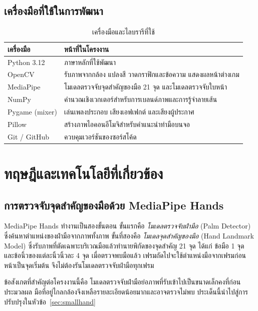 \documentclass[12pt,a4paper]{report}
\begin{document}
\section{เครื่องมือที่ใช้ในการพัฒนา}
\begin{table}[H]
  \centering
  \caption{เครื่องมือและไลบรารีที่ใช้}
  \label{tab:tools}
  \begin{tabularx}{\textwidth}{l Y}
    \toprule
    \textbf{เครื่องมือ} & \textbf{หน้าที่ในโครงงาน} \\
    \midrule
    Python 3.12 & ภาษาหลักที่ใช้พัฒนา \\
    OpenCV & รับภาพจากกล้อง แปลงสี วาดกราฟิกและข้อความ แสดงผลหน้าต่างเกม \\
    MediaPipe & โมเดลตรวจจับจุดสำคัญของมือ 21 จุด และโมเดลตรวจจับใบหน้า \\
    NumPy & คำนวณเชิงเวกเตอร์สำหรับการเบลนด์ภาพและการรู้จำลายเส้น \\
    Pygame (mixer) & เล่นเพลงประกอบ เสียงเอฟเฟกต์ และเสียงผู้ประกาศ \\
    Pillow & สร้างภาพไอคอนอีโมจิสำหรับคำแนะนำท่ามือบนจอ \\
    Git / GitHub & ควบคุมเวอร์ชันของซอร์สโค้ด \\
    \bottomrule
  \end{tabularx}
\end{table}

\chapter{ทฤษฎีและเทคโนโลยีที่เกี่ยวข้อง}

\section{การตรวจจับจุดสำคัญของมือด้วย MediaPipe Hands}
MediaPipe Hands \cite{zhang2020hands} ทำงานเป็นสองขั้นตอน ขั้นแรกคือ \textit{โมเดลตรวจจับฝ่ามือ} (Palm Detector)
ซึ่งค้นหาตำแหน่งของฝ่ามือจากภาพทั้งภาพ ขั้นที่สองคือ \textit{โมเดลจุดสำคัญของมือ} (Hand Landmark Model)
ซึ่งรับภาพที่ตัดเฉพาะบริเวณมือแล้วทำนายพิกัดของจุดสำคัญ 21 จุด ได้แก่ ข้อมือ 1 จุด และข้อนิ้วของแต่ละนิ้วนิ้วละ 4 จุด
เมื่อตรวจพบมือแล้ว เฟรมถัดไปจะใช้ตำแหน่งมือจากเฟรมก่อนหน้าเป็นจุดเริ่มต้น จึงไม่ต้องรันโมเดลตรวจจับฝ่ามือทุกเฟรม

ข้อสังเกตที่สำคัญต่อโครงงานนี้คือ โมเดลตรวจจับฝ่ามือย่อภาพที่รับเข้าไปเป็นขนาดเล็กคงที่ก่อนประมวลผล
มือที่อยู่ไกลกล้องจึงเหลือรายละเอียดน้อยมากและอาจตรวจไม่พบ ประเด็นนี้นำไปสู่การปรับปรุงในหัวข้อ~\ref{sec:smallhand}
\end{document}
